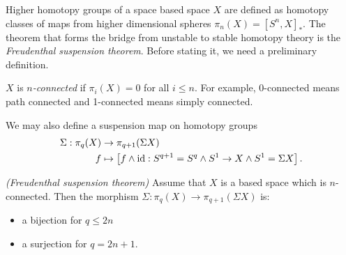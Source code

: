 \documentclass{article}[11pt]
\newcommand{\smashprod}{\wedge} %
\begin{document}
Higher homotopy groups of a space based space $X$ are defined as homotopy classes of maps from higher dimensional spheres $\pi_n(X)=[S^n,X]_\ast$. The theorem that forms the bridge from unstable to stable homotopy theory is the \emph{Freudenthal suspension theorem}. Before stating it, we need a preliminary definition.


\begin{definition} $X$ is \textit{$n$-connected} if $\pi_i (X) = 0$ for all $i\leq n$. For example, 0-connected means path connected and 1-connected means simply connected.
\end{definition}

We may also define a suspension map on homotopy groups
\begin{align*}
	\Sigma : \pi_q (X) &\to \pi_{q+1}(\Sigma X) \\
	f &\mapsto \left[f\smashprod \id : S^{q+1} = S^q \smashprod S^1 \to X\smashprod S^1 = \Sigma X\right].
\end{align*}

\begin{theorem}\label{thm:Freudenthal-suspension} \textit{(Freudenthal suspension theorem)}
Assume that $X$ is a based space which is $n$-connected. Then the morphism $\Sigma: \pi_q(X) \to \pi_{q+1}(\Sigma X)$ is:
\begin{itemize}
	\item a bijection for $q\leq 2n$
	\item a surjection for $q= 2n+1$.
\end{itemize}
\end{theorem}

\end{document}

